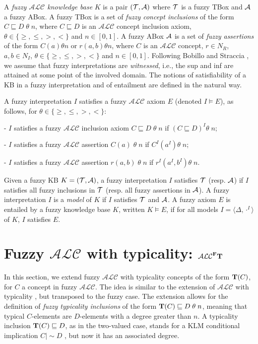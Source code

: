 \documentclass[runningheads]{llncs}
\newcommand {\ent} {\mathrel{{\scriptstyle\mid\!\sim}}}
\newcommand {\sx} {\langle}
\newcommand {\dx} {\rangle}
\newcommand{\tip}{{\bf T}}
\newcommand{\alc}{\mathcal{ALC}}
\newcommand{\alcFt}{\mathcal{ALC}^{\Fe}\tip}
\newcommand {\Fe} {{\bf F}}
\begin{document}
A {\em fuzzy $\alc$ knowledge base} $K$ is a pair $({\cal T}, {\cal A})$ where ${\cal T}$ is a fuzzy TBox  and ${\cal A}$ a fuzzy ABox. A fuzzy TBox is a set of {\em fuzzy concept inclusions} of the form $C \sqsubseteq D \;\theta\; n$, where $C \sqsubseteq D$ is an $\alc$ concept inclusion axiom, $\theta \in \{\geq,\leq,>,<\}$ and $n \in [0,1]$. A fuzzy ABox ${\cal A}$ is a set of {\em fuzzy assertions} of the form $C(a) \theta n$ or $r(a,b) \theta n$, where $C$ is an $\alc$ concept, $r\in N_R$, $a,b \in N_I$,  $\theta \in \{{\geq,}\leq,>,<\}$ and $n \in [0,1]$.
Following Bobillo and Straccia  \cite{BobilloOWL2EL2018}, we assume that fuzzy interpretations are {\em witnessed}, i.e., the sup and inf are attained at some point of the involved domain.
The notions of satisfiability of a KB  in a fuzzy interpretation and of entailment are defined in the natural way.
\begin{definition} \label{satisfiability}
A  fuzzy interpretation $I$ satisfies a fuzzy $\alc$ axiom $E$ (denoted $I \models E$), as follows, 
 for $\theta \in \{\geq,\leq,>,<\}$:

- $I$ satisfies a fuzzy $\alc$ inclusion axiom $C \sqsubseteq D \;\theta\; n$ if $(C \sqsubseteq D)^I \theta\; n$;

- $I$ satisfies a fuzzy $\alc$ assertion $C(a) \; \theta \; n$ if $C^I(a^I) \theta\; n$;
 
- $I$ satisfies a fuzzy $\alc$ assertion $r(a,b) \; \theta \; n$ if $r^I(a^I,b^I) \theta\; n$.

\noindent
Given  a fuzzy KB $K=({\cal T}, {\cal A})$,
 a fuzzy interpretation $I$  satisfies ${\cal T}$ (resp. ${\cal A}$) if $I$ satisfies all fuzzy  inclusions in ${\cal T}$ (resp. all fuzzy assertions in ${\cal A}$).
A fuzzy interpretation $I$ is a \emph{model} of $K$ if $I$ satisfies ${\cal T}$ and ${\cal A}$.
A fuzzy axiom $E$   {is entailed by a fuzzy knowledge base $K$}, written $K \models E$, if for all models $I=$$\sx \Delta,  \cdot^I\dx$ of $K$,
$I$ satisfies $E$.
\end{definition}




\section{Fuzzy $\alc$ with typicality: $\alcFt$} \label{sec:fuzzyalc+T}

In this section, we extend fuzzy $\alc$ with typicality concepts of the form $\tip(C)$, for $C$ a concept in fuzzy $\alc$.
The idea is similar to the extension of $\alc$ with typicality \cite{FI09}, 
but transposed to the fuzzy case. The extension allows for the definition of {\em fuzzy typicality inclusions} of the form
$\tip(C) \sqsubseteq D \;\theta \;n$,  
meaning that typical $C$-elements are $D$-elements with a degree greater than $n$. A typicality  inclusion $\tip(C) \sqsubseteq D$, as in the two-valued case, stands for a KLM conditional implication $C \ent D$ \cite{KrausLehmannMagidor:90,whatdoes}, but now it has an associated degree.
\end{document}
